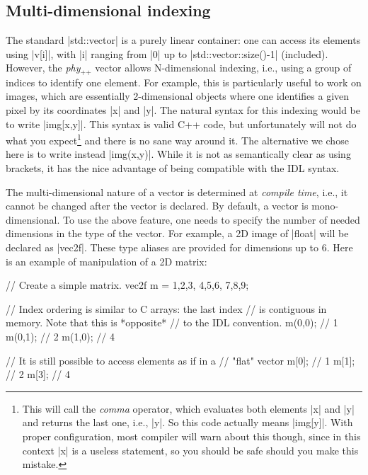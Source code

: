 \documentclass[12pt]{report}
\newcommand{\phypp}{\textit{phy}$_{\text{++}}$\xspace}
\newcommand{\stdvec}{\cppinline|std::vector|\xspace}
\begin{document}
\subsection{Multi-dimensional indexing \label{SEC:core:overview:multidim}}

The standard \stdvec is a purely linear container: one can access its elements using \cppinline|v[i]|, with \cppinline|i| ranging from \cppinline|0| up to \cppinline|std::vector::size()-1| (included). However, the \phypp vector allows N-dimensional indexing, i.e., using a group of indices to identify one element. For example, this is particularly useful to work on images, which are essentially 2-dimensional objects where one identifies a given pixel by its coordinates \cppinline|x| and \cppinline|y|. The natural syntax for this indexing would be to write \cppinline|img[x,y]|. This syntax is valid C++ code, but unfortunately will not do what you expect\footnote{This will call the \emph{comma} operator, which evaluates both elements \cppinline|x| and \cppinline|y| and returns the last one, i.e., \cppinline|y|. So this code actually means \cppinline|img[y]|. With proper configuration, most compiler will warn about this though, since in this context \cppinline|x| is a useless statement, so you should be safe should you make this mistake.} and there is no sane way around it. The alternative we chose here is to write instead \cppinline|img(x,y)|. While it is not as semantically clear as using brackets, it has the nice advantage of being compatible with the IDL syntax.

The multi-dimensional nature of a vector is determined at \emph{compile time}, i.e., it cannot be changed after the vector is declared. By default, a vector is mono-dimensional. To use the above feature, one needs to specify the number of needed dimensions in the type of the vector. For example, a 2D image of \cppinline|float| will be declared as \cppinline|vec2f|. These type aliases are provided for dimensions up to $6$. Here is an example of manipulation of a 2D matrix:

\begin{cppcode}
// Create a simple matrix.
vec2f m = {{1,2,3}, {4,5,6}, {7,8,9}};

// Index ordering is similar to C arrays: the last index
// is contiguous in memory. Note that this is *opposite*
// to the IDL convention.
m(0,0); // 1
m(0,1); // 2
m(1,0); // 4

// It is still possible to access elements as if in a
// "flat" vector
m[0]; // 1
m[1]; // 2
m[3]; // 4
\end{cppcode}
\end{document}
